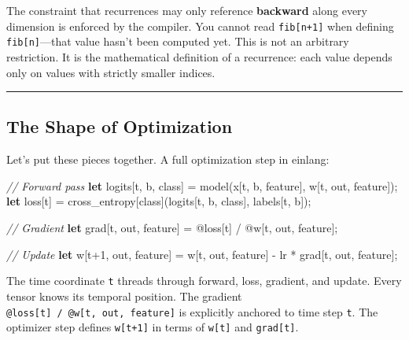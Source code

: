 \documentclass[11pt,]{article}
\newenvironment{Shaded}{}{}
\newcommand{\CommentTok}[1]{\textcolor[rgb]{0.38,0.63,0.69}{\textit{#1}}}
\newcommand{\DecValTok}[1]{\textcolor[rgb]{0.25,0.63,0.44}{#1}}
\newcommand{\KeywordTok}[1]{\textcolor[rgb]{0.00,0.44,0.13}{\textbf{#1}}}
\newcommand{\NormalTok}[1]{#1}
\newcommand{\OperatorTok}[1]{\textcolor[rgb]{0.40,0.40,0.40}{#1}}
\begin{document}
The constraint that recurrences may only reference \textbf{backward}
along every dimension is enforced by the compiler. You cannot read
\texttt{fib{[}n+1{]}} when defining \texttt{fib{[}n{]}}---that value
hasn't been computed yet. This is not an arbitrary restriction. It is
the mathematical definition of a recurrence: each value depends only on
values with strictly smaller indices.

\begin{center}\rule{0.5\linewidth}{0.4pt}\end{center}

\hypertarget{the-shape-of-optimization}{%
\subsection{The Shape of Optimization}\label{the-shape-of-optimization}}

Let's put these pieces together. A full optimization step in einlang:

\begin{Shaded}
\begin{Highlighting}[]
\CommentTok{// Forward pass}
\KeywordTok{let}\NormalTok{ logits}\OperatorTok{[}\NormalTok{t, b, class}\OperatorTok{]}\NormalTok{ = model(x}\OperatorTok{[}\NormalTok{t, b, feature}\OperatorTok{]}\NormalTok{, w}\OperatorTok{[}\NormalTok{t, out, feature}\OperatorTok{]}\NormalTok{);}
\KeywordTok{let}\NormalTok{ loss}\OperatorTok{[}\NormalTok{t}\OperatorTok{]}\NormalTok{ = cross_entropy}\OperatorTok{[}\NormalTok{class}\OperatorTok{]}\NormalTok{(logits}\OperatorTok{[}\NormalTok{t, b, class}\OperatorTok{]}\NormalTok{, labels}\OperatorTok{[}\NormalTok{t, b}\OperatorTok{]}\NormalTok{);}

\CommentTok{// Gradient}
\KeywordTok{let}\NormalTok{ grad}\OperatorTok{[}\NormalTok{t, out, feature}\OperatorTok{]}\NormalTok{ = @loss}\OperatorTok{[}\NormalTok{t}\OperatorTok{]}\NormalTok{ / @w}\OperatorTok{[}\NormalTok{t, out, feature}\OperatorTok{]}\NormalTok{;}

\CommentTok{// Update}
\KeywordTok{let}\NormalTok{ w}\OperatorTok{[}\NormalTok{t+}\DecValTok{1}\NormalTok{, out, feature}\OperatorTok{]}\NormalTok{ = w}\OperatorTok{[}\NormalTok{t, out, feature}\OperatorTok{]}\NormalTok{ - lr * grad}\OperatorTok{[}\NormalTok{t, out, feature}\OperatorTok{]}\NormalTok{;}
\end{Highlighting}
\end{Shaded}

The time coordinate \texttt{t} threads through forward, loss, gradient,
and update. Every tensor knows its temporal position. The gradient
\texttt{@loss{[}t{]}\ /\ @w{[}t,\ out,\ feature{]}} is explicitly
anchored to time step \texttt{t}. The optimizer step defines
\texttt{w{[}t+1{]}} in terms of \texttt{w{[}t{]}} and
\texttt{grad{[}t{]}}.
\end{document}
